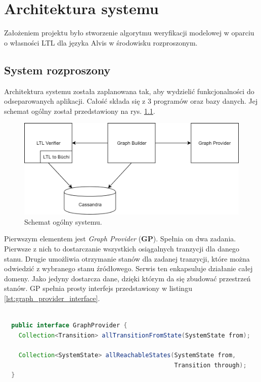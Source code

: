 \chapter{Architektura systemu}

Założeniem projektu było stworzenie algorytmu weryfikacji modelowej w oparciu o własności LTL dla języka Alvis w środowisku rozproszonym.


\section{System rozproszony}

Architektura systemu została zaplanowana tak, aby wydzielić funkcjonalności do odseparowanych aplikacji.
Całość składa się z 3 programów oraz bazy danych.
Jej schemat ogólny został przedstawiony na rys. \ref{fig:system_overview}.

\begin{figure}[h]
    \centering
    \includegraphics[width=\linewidth,keepaspectratio]{img/system_overview.png}
    \caption{Schemat ogólny systemu.}
    \label{fig:system_overview}
\end{figure}

Pierwszym elementem jest \textit{Graph Provider} (\textbf{GP}).
Spełnia on dwa zadania.
Pierwsze z nich to dostarczanie wszystkich osiągalnych tranzycji dla danego stanu.
Drugie umożliwia otrzymanie stanów dla zadanej tranzycji, które można odwiedzić z wybranego stanu źródłowego.
Serwis ten enkapsuluje działanie całej domeny.
Jako jedyny dostarcza dane, dzięki którym da się zbudować przestrzeń stanów.
GP spełnia prosty interfejs przedstawiony w listingu \ref{lst:graph_provider_interface}.

\begin{minipage}{\linewidth}
\begin{lstlisting}[caption={Interfejs implementowany przez GP.},captionpos=b,label={lst:graph_provider_interface},language=Java]

  public interface GraphProvider {
    Collection<Transition> allTransitionFromState(SystemState from);

    Collection<SystemState> allReachableStates(SystemState from,
                                               Transition through);
  }
\end{lstlisting}
\end{minipage}

